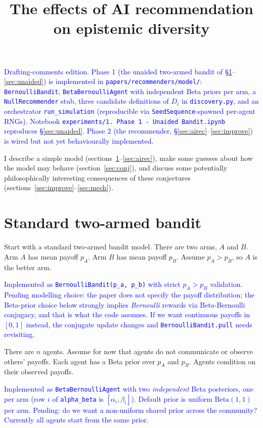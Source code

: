 \documentclass[12pt]{article}
\title{The effects of AI recommendation on epistemic diversity}
\author{}
\date{}
\newcommand{\ignacio}[1]{\textcolor{blue}{#1}}
\begin{document}
\maketitle

\ignacio{Drafting-comments edition. Phase 1 (the unaided two-armed bandit of \S\ref{sec:bandit}--\ref{sec:unaided}) is implemented in \texttt{papers/recommenders/model/}: \texttt{BernoulliBandit}, \texttt{BetaBernoulliAgent} with independent Beta priors per arm, a \texttt{NullRecommender} stub, three candidate definitions of $D_i$ in \texttt{discovery.py}, and an orchestrator \texttt{run\_simulation} (reproducible via \texttt{SeedSequence}-spawned per-agent RNGs). Notebook \texttt{experiments/1.\ Phase 1 - Unaided Bandit.ipynb} reproduces \S\ref{sec:unaided}. Phase 2 (the recommender, \S\ref{sec:airec}--\ref{sec:improve}) is wired but not yet behaviourally implemented.}

I describe a simple model (sections~\ref{sec:bandit}--\ref{sec:airec}), make some guesses about how the model may behave (section~\ref{sec:conj}), and discuss some potentially philosophically interesting consequences of these conjectures (sections~\ref{sec:improve}--\ref{sec:mech}).

\section{Standard two-armed bandit}
\label{sec:bandit}

Start with a standard two-armed bandit model.
There are two arms, $A$ and $B$.
Arm $A$ has mean payoff $p_A$.
Arm $B$ has mean payoff $p_B$.
Assume $p_A > p_B$, so $A$ is the better arm.

\ignacio{Implemented as \texttt{BernoulliBandit(p\_a, p\_b)} with strict $p_A > p_B$ validation. Pending modelling choice: the paper does not specify the payoff distribution; the Beta-prior choice below strongly implies \emph{Bernoulli} rewards via Beta-Bernoulli conjugacy, and that is what the code assumes. If we want continuous payoffs in $[0,1]$ instead, the conjugate update changes and \texttt{BernoulliBandit.pull} needs revisiting.}

There are $n$ agents.
Assume for now that agents do not communicate or observe others' payoffs.
Each agent has a Beta prior over $p_A$ and $p_B$.
Agents condition on their observed payoffs.

\ignacio{Implemented as \texttt{BetaBernoulliAgent} with two \emph{independent} Beta posteriors, one per arm (row $i$ of \texttt{alpha\_beta} is $[\alpha_i, \beta_i]$). Default prior is uniform $\mathrm{Beta}(1,1)$ per arm. Pending: do we want a non-uniform shared prior across the community? Currently all agents start from the same prior.}
\end{document}
